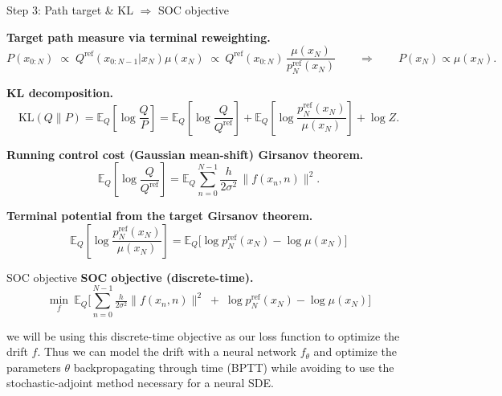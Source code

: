 \documentclass[aspectratio=169,xcolor=dvipsnames]{beamer}
\begin{document}

\begin{frame}[t]{Step 3: Path target \& KL $\Rightarrow$ SOC objective}
\scriptsize


\textbf{Target path measure via terminal reweighting.}
\[
P(x_{0:N}) \;\propto\; Q^{\text{ref}}(x_{0:N-1} | x_N) \mu(x_N) \;\propto\ Q^{\text{ref}}(x_{0:N})\,\frac{\mu(x_N)}{p^{\text{ref}}_N(x_N)}
\qquad\Longrightarrow\qquad P(x_N)\propto\mu(x_N).
\]

\textbf{KL decomposition.}
\[
\mathrm{KL}(Q\|P)
=\mathbb E_{Q}\!\left[\log\frac{Q}{P}\right]
=\mathbb E_{Q}\!\left[\log\frac{Q}{Q^{\text{ref}}}\right]
+\mathbb E_{Q}\!\left[\log\frac{p^{\text{ref}}_N(x_N)}{\mu(x_N)}\right] + \log Z.
\]


\medskip
\textbf{Running control cost (Gaussian mean-shift) Girsanov theorem.}
\[
\mathbb E_{Q}\!\left[\log\frac{Q}{Q^{\text{ref}}}\right]
=\mathbb E_Q \sum_{n=0}^{N-1}\frac{h}{2\sigma^2}\,\|f(x_n,n)\|^2.
\]

\textbf{Terminal potential from the target Girsanov theorem.}
\[
\mathbb E_{Q}\!\left[\log\frac{p^{\text{ref}}_N(x_N)}{\mu(x_N)}\right]
=\mathbb E_Q\!\big[\log p^{\text{ref}}_N(x_N)-\log \mu(x_N)\big]
\]

\end{frame}

\begin{frame}[t]{SOC objective}
\footnotesize
\medskip
\textbf{SOC objective (discrete-time).}
\[
\boxed{\ \min_{f}\ \mathbb E_Q\!\Big[\sum_{n=0}^{N-1}\tfrac{h}{2\sigma^2}\|f(x_n,n)\|^2\;+\;\log p^{\text{ref}}_N(x_N)-\log \mu(x_N)\Big]\ }
\]

we will be using this discrete-time objective as our loss function to optimize the drift $f$. Thus we can model the drift with a neural network $f_\theta$ and optimize the parameters $\theta$ backpropagating through time (BPTT) while avoiding to use the stochastic-adjoint method necessary for a neural SDE.
\end{frame}

\end{document}
